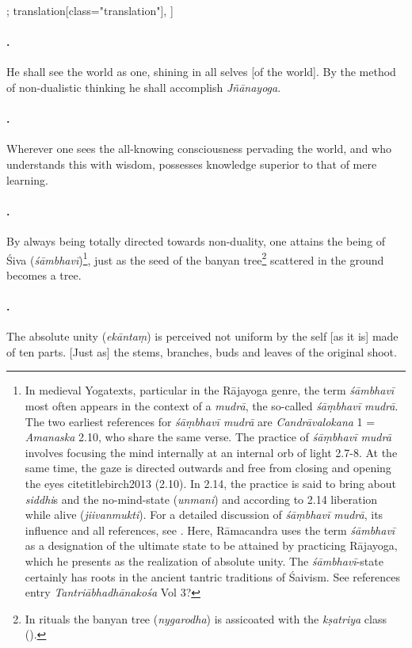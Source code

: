 \begin{alignment}[
  texts=edition[class="edition"];
  translation[class="translation"],
  ]
\begin{translation}
\begin{tlate}
 \paragraph{\textsuperscript{}.} He shall see the world as one, shining in all selves [of the world]. By the method of non-dualistic thinking he shall accomplish \textit{Jñānayoga}.
 \paragraph{\textsuperscript{}.} Wherever one sees the all-knowing consciousness pervading the world, and who understands this with wisdom, possesses knowledge superior to that of mere learning.
 \paragraph{\textsuperscript{}.} By always being totally directed towards non-duality, one attains the being of Śiva (\textit{śāmbhavī})\footnote{In medieval Yogatexts, particular in the Rājayoga genre, the term \textit{śāmbhavī} most often appears in the context of a \textit{mudrā}, the so-called \textit{śāṃbhavī mudrā}. The two earliest references for \textit{śāṃbhavī mudrā} are \textit{Candrāvalokana} 1 = \textit{Amanaska} 2.10, who share the same verse. The practice of \textit{śāṃbhavī mudrā} involves focusing the mind internally at an internal orb of light  2.7-8. At the same time, the gaze is directed outwards and free from closing and opening the eyes citetitle{birch2013} (2.10). In  2.14, the practice is said to bring about \textit{siddhi}s and the no-mind-state (\textit{unmani}) and according to  2.14 liberation while alive (\textit{jiivanmukti}). For a detailed discussion of \textit{śāṃbhavī mudrā}, its influence and all references, see \citeauthor[2013:71-79]{birch2013}. Here, Rāmacandra uses the term \textit{śāmbhavī} as a designation of the ultimate state to be attained by practicing Rājayoga, which he presents as the realization of absolute unity. The \textit{śāmbhavī}-state certainly has roots in the ancient tantric traditions of Śaivism. See references entry \textit{Tantriābhadhānakośa} Vol 3?}, just as the seed of the banyan tree\footnote{In rituals the banyan tree (\textit{nygarodha}) is assicoated with the \textit{kṣatriya} class (\citeauthor[1998:27]{smith1998}).} scattered in the ground becomes a tree.
 \paragraph{\textsuperscript{}.} The absolute unity (\textit{ekāntaṃ}) is perceived not uniform by the self [as it is] made of ten parts. [Just as] the stems, branches, buds and leaves of the original shoot.
  \vfill
\end{tlate}
\end{translation}
\end{alignment}
